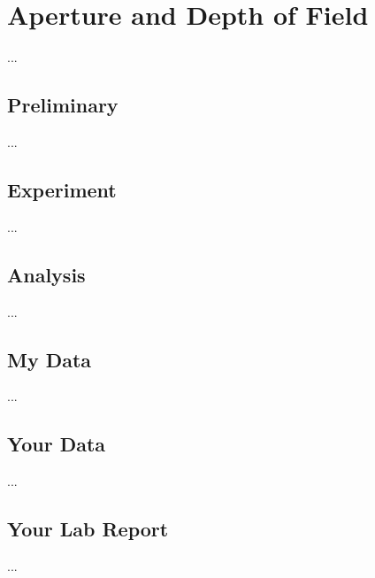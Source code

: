 \chapter{Aperture and Depth of Field}
...
\section{Preliminary}
...
\section{Experiment}
...
\section{Analysis}
...
\section{My Data}
...
\section{Your Data}
...
\section{Your Lab Report}
...